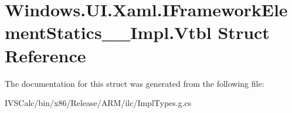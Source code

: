 \hypertarget{struct_windows_1_1_u_i_1_1_xaml_1_1_i_framework_element_statics_____impl_1_1_vtbl}{}\section{Windows.\+U\+I.\+Xaml.\+I\+Framework\+Element\+Statics\+\_\+\+\_\+\+Impl.\+Vtbl Struct Reference}
\label{struct_windows_1_1_u_i_1_1_xaml_1_1_i_framework_element_statics_____impl_1_1_vtbl}


The documentation for this struct was generated from the following file\+:\begin{DoxyCompactItemize}
\item 
I\+V\+S\+Calc/bin/x86/\+Release/\+A\+R\+M/ilc/Impl\+Types.\+g.\+cs\end{DoxyCompactItemize}

